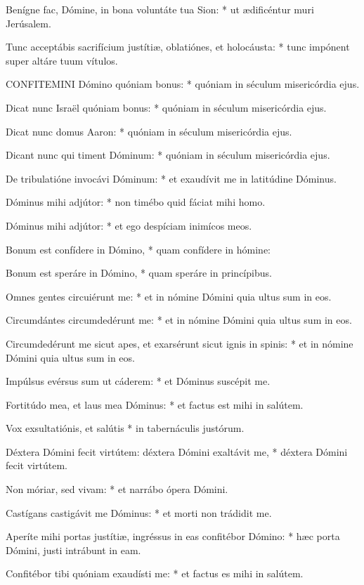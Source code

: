 Benígne fac, Dómine, in bona voluntáte tua Sion: * ut ædificéntur muri Jerúsalem.

Tunc acceptábis sacrifícium justítiæ, oblatiónes, et holocáusta: * tunc impónent super altáre tuum vítulos.


\lettrine[lines=2]{C}{ONFITEMINI} Dómino quóniam bonus: * quóniam in séculum misericórdia ejus.

Dicat nunc Israël quóniam bonus: * quóniam in séculum misericórdia ejus.

Dicat nunc domus Aaron: * quóniam in séculum misericórdia ejus.

Dicant nunc qui timent Dóminum: * quóniam in séculum misericórdia ejus.

De tribulatióne invocávi Dóminum: * et exaudívit me in latitúdine Dóminus.

Dóminus mihi adjútor: * non timébo quid fáciat mihi homo.

Dóminus mihi adjútor: * et ego despíciam inimícos meos.

Bonum est confídere in Dómino, * quam confídere in hómine:

Bonum est speráre in Dómino, * quam speráre in princípibus.

Omnes gentes circuiérunt me: * et in nómine Dómini quia ultus sum in eos.

Circumdántes circumdedérunt me: * et in nómine Dómini quia ultus sum in eos.

Circumdedérunt me sicut apes, et exarsérunt sicut ignis in spinis: * et in nómine Dómini quia ultus sum in eos.

Impúlsus evérsus sum ut cáderem: * et Dóminus suscépit me.

Fortitúdo mea, et laus mea Dóminus: * et factus est mihi in salútem.

Vox exsultatiónis, et salútis * in tabernáculis justórum.

Déxtera Dómini fecit virtútem: déxtera Dómini exaltávit me, * déxtera Dómini fecit virtútem.

Non móriar, sed vivam: * et narrábo ópera Dómini.

Castígans castigávit me Dóminus: * et morti non trádidit me.

Aperíte mihi portas justítiæ, ingréssus in eas confitébor Dómino: * hæc porta Dómini, justi intrábunt in eam.

Confitébor tibi quóniam exaudísti me: * et factus es mihi in salútem.

